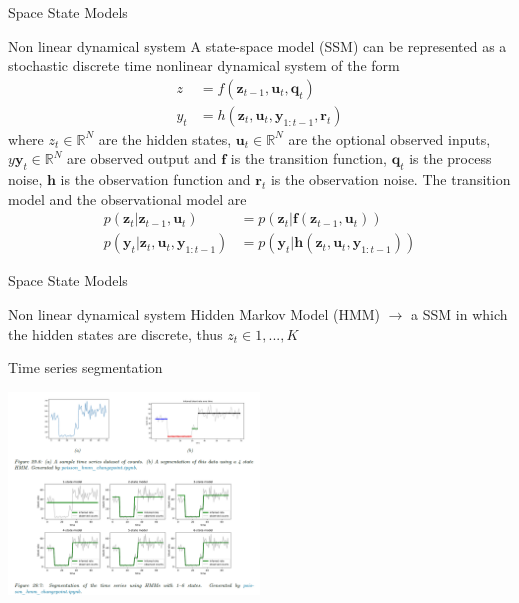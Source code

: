 \documentclass[11pt]{beamer}
\begin{document}
\begin{frame}{Space State Models  \cite{pml2Book}}
\begin{alertblock}{Non linear dynamical system}
A state-space model (SSM) can be represented as a stochastic discrete time nonlinear dynamical system of the form 
\begin{equation*}
\begin{split}
z &= f(\textbf{z}_{t-1},\textbf{u}_{t},\textbf{q}_{t}) \\
y_{t} &= h(\textbf{z}_{t},\textbf{u}_{t},\textbf{y}_{1:t-1},\textbf{r}_{t})
\end{split}
\end{equation*}
where $z_{t} \in 	\mathbb{R}^{N}$ are the hidden states, $\textbf{u}_{t}  \in 	\mathbb{R}^{N}$ are the optional observed inputs, $y\textbf{y}_{t}  \in 	\mathbb{R}^{N}$ are observed output and $\textbf{f}$ is the transition function, $\textbf{q}_{t}$ is the process noise, $\textbf{h}$ is the observation function and $\textbf{r}_{t}$ is the observation noise. The transition model and the observational model are 
\begin{equation*}
\begin{split}
p(\textbf{z}_{t}|\textbf{z}_{t-1},\textbf{u}_{t})& = p(\textbf{z}_{t}|\textbf{f}(\textbf{z}_{t-1},\textbf{u}_{t}))\\
p(\textbf{y}_{t}|\textbf{z}_{t},\textbf{u}_{t},\textbf{y}_{1:t-1})& =p(\textbf{y}_{t}|\textbf{h}(\textbf{z}_{t},\textbf{u}_{t},\textbf{y}_{1:t-1}))
\end{split}
\end{equation*}
\end{alertblock}
\end{frame}

\begin{frame}{Space State Models  \cite{pml2Book}}
\begin{alertblock}{Non linear dynamical system}
Hidden Markov Model (HMM) $\rightarrow$ a SSM in which the hidden states are discrete, thus $z_{t}\in {1,...,K}$
\end{alertblock}
\begin{exampleblock}{Time series segmentation}
\begin{center}
     \includegraphics[width=0.5\textwidth]{Pic/time_series_segmentation.png}
    \end{center}
    \end{exampleblock}
\end{frame}
\end{document}
